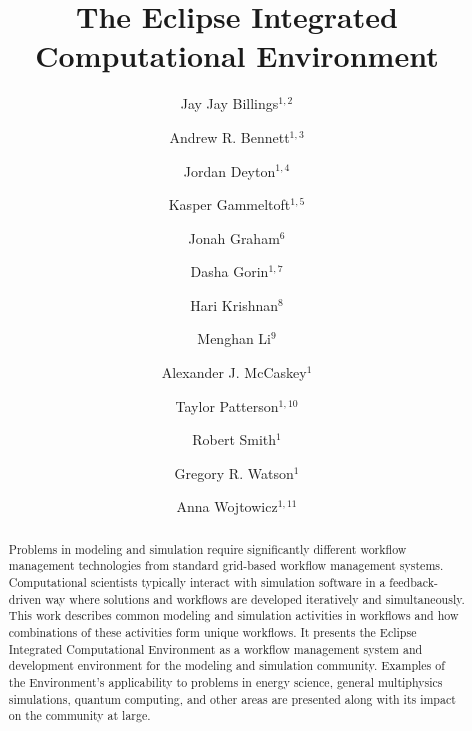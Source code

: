 \documentclass{elsart}
\begin{document}
\begin{frontmatter}

\title{The Eclipse Integrated Computational Environment}

\author{Jay Jay Billings$^{1,2}$}
\author{Andrew R. Bennett$^{1,3}$}
\author{Jordan Deyton$^{1,4}$}
\author{Kasper Gammeltoft$^{1,5}$}
\author{Jonah Graham$^{6}$}
\author{Dasha Gorin$^{1,7}$}
\author{Hari Krishnan$^{8}$}
\author{Menghan Li$^{9}$}
\author{Alexander J. McCaskey$^{1}$}
\author{Taylor Patterson$^{1,10}$}
\author{Robert Smith$^{1}$}
\author{Gregory R. Watson$^{1}$}
\author{Anna Wojtowicz$^{1,11}$}

\address{$^{1}$Computer Science and Mathematics Division, Oak Ridge National
Laboratory, Oak Ridge, TN 37830, USA}
\address{$^{2}$The Bredesen Center for Interdisciplinary Research and Graduate
Education, University of Tennessee, 444 Greve Hall, 821 Volunteer
  Blvd. Knoxville, TN 37996-3394}
\address{$^{3}$University of Washington, Seattle, WA 98105}
\address{$^{4}$General Electric Company, 3200 North Grandview Blvd Waukesha, WI
53188-1678}
\address{$^{5}$Georgia Institute of Technology North Avenue, Atlanta, GA 30332}
\address{$^{6}$Kichwa Coders Ltd., 1 Plomer Green Avenue Downley, High Wycombe
HP13 5LN United Kingdom}
\address{$^{7}$Northwestern University, 633 Clark Street Evanston, IL 60208}
\address{$^{8}$Lawrence Berkeley National Laboratory, 1 Cyclotron Rd, Berkeley,
CA 94720}
\address{$^{9}$Department of Computer Science and Department of Biological
Sciences, Purdue University, West Lafayette, IN 47906} 
\address{$^{10}$Acato Information Management, LLC, 114 Union Valley Rd., Oak Ridge,
TN 37830}
\address{$^{11}$Colorado State University, Fort Collins, CO 80523}

\begin{abstract}

Problems in modeling and simulation require significantly different
workflow management technologies from standard grid-based workflow
management systems. Computational scientists typically interact with
simulation software in a feedback-driven way where solutions and
workflows are developed iteratively and simultaneously. This work
describes common modeling and simulation activities in workflows and how combinations of these
activities form unique workflows. It presents the Eclipse Integrated
Computational Environment as a workflow management system and
development environment for the modeling and simulation community.
Examples of the Environment's applicability to problems in energy
science, general multiphysics simulations, quantum computing, and other
areas are presented along with its impact on the community at large.


\end{abstract}
\end{frontmatter}
\end{document}
